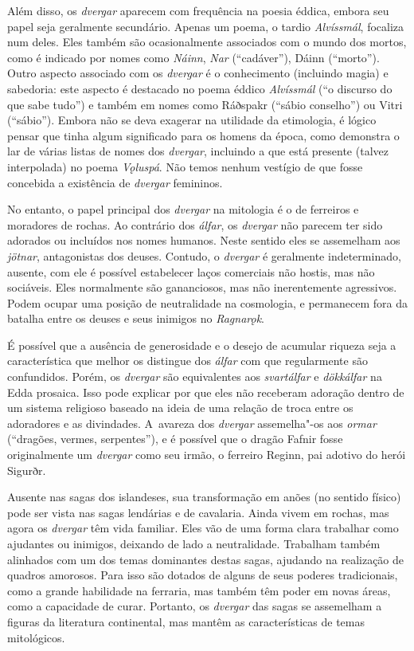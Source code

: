 Além disso, os \emph{dvergar} aparecem com frequência na poesia éddica,
embora seu papel seja geralmente secundário. Apenas um poema, o tardio
\emph{Alvíssmál}, focaliza num deles. Eles também são ocasionalmente
associados com o mundo dos mortos, como é indicado por nomes como
\emph{Náinn}, \emph{Nar} (``cadáver''), Dáinn (``morto''). Outro aspecto
associado com os \emph{dvergar} é o conhecimento (incluindo magia) e
sabedoria: este aspecto é destacado no poema éddico \emph{Alvíssmál}
(``o discurso do que sabe tudo'') e também em nomes como Ráðspakr
(``sábio conselho'') ou Vitri (``sábio''). Embora não se deva exagerar
na utilidade da etimologia, é lógico pensar que tinha algum significado
para os homens da época, como demonstra o lar de várias listas de nomes
dos \emph{dvergar}, incluindo a que está presente (talvez interpolada)
no poema \emph{Vǫluspá}. Não temos nenhum vestígio de que fosse
concebida a existência de \emph{dvergar} femininos.

No entanto, o papel principal dos \emph{dvergar} na mitologia é o de
ferreiros e moradores de rochas. Ao contrário dos \emph{álfar}, os
\emph{dvergar} não parecem ter sido adorados ou incluídos nos nomes
humanos. Neste sentido eles se assemelham aos \emph{jötnar},
antagonistas dos deuses. Contudo, o \emph{dvergar} é geralmente
indeterminado, ausente, com ele é possível estabelecer laços comerciais
não hostis, mas não sociáveis. Eles normalmente são gananciosos, mas não
inerentemente agressivos. Podem ocupar uma posição de neutralidade na
cosmologia, e permanecem fora da batalha entre os deuses e seus inimigos
no \emph{Ragnarǫk}.

É possível que a ausência de generosidade e o desejo de acumular riqueza
seja a característica que melhor os distingue dos \emph{álfar} com que
regularmente são confundidos. Porém, os \emph{dvergar} são equivalentes
aos \emph{svartálfar} e \emph{dökkálfar} na Edda prosaica. Isso pode
explicar por que eles não receberam adoração dentro de um sistema
religioso baseado na ideia de uma relação de troca entre os adoradores e
as divindades. A~avareza dos \emph{dvergar} assemelha"-os aos
\emph{ormar} (``dragões, vermes, serpentes''), e é possível que o dragão
Fafnir fosse originalmente um \emph{dvergar} como seu irmão, o ferreiro
Reginn, pai adotivo do herói Sigurðr.

Ausente nas sagas dos islandeses, sua transformação em anões (no sentido
físico) pode ser vista nas sagas lendárias e de cavalaria. Ainda vivem
em rochas, mas agora os \emph{dvergar} têm vida familiar. Eles vão de
uma forma clara trabalhar como ajudantes ou inimigos, deixando de lado a
neutralidade. Trabalham também alinhados com um dos temas dominantes
destas sagas, ajudando na realização de quadros amorosos. Para isso são
dotados de alguns de seus poderes tradicionais, como a grande habilidade
na ferraria, mas também têm poder em novas áreas, como a capacidade de
curar. Portanto, os \emph{dvergar} das sagas se assemelham a figuras da
literatura continental, mas mantêm as características de temas
mitológicos.

